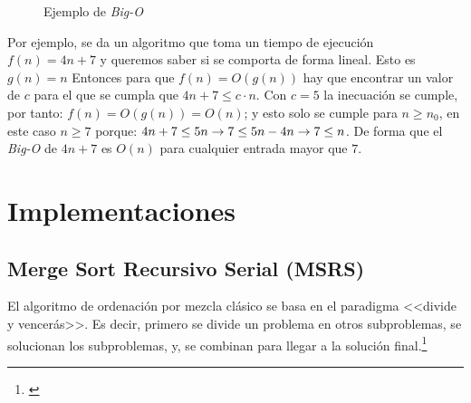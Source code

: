\documentclass[titlepage]{article}
\begin{document}
\begin{figure}
\captionsetup{justification=centering}
\centering    
    
    \caption{Ejemplo de \textit{Big-O}}
    \label{fig:bigO}
    
\end{figure}

Por ejemplo, se da un algoritmo que toma un tiempo de ejecución \(f(n) = 4n+7\) y queremos saber si se comporta de forma lineal. Esto es \(g(n)=n\) Entonces para que \(f(n) = O(g(n))\) hay que encontrar un valor de \(c\) para el que se cumpla que \(4n+7 \leq c\cdot n\). Con \(c=5\) la inecuación se cumple, por tanto: \(f(n) = O(g(n)) = O(n)\); y esto solo se cumple para \(n \geq n_0\), en este caso \(n\geq 7\) porque: \(4n+7 \leq 5n \space \rightarrow 7 \leq 5n - 4n   \rightarrow 7 \leq n\). De forma que el \textit{Big-O} de \(4n+7\) es \(O(n)\) para cualquier entrada mayor que \(7\).



\section{Implementaciones}

\subsection{Merge Sort Recursivo Serial (MSRS)}
El algoritmo de ordenación por mezcla clásico se basa en el paradigma <<divide y vencerás>>. Es decir, primero se divide un problema en otros subproblemas, se solucionan los subproblemas, y, se combinan para llegar a la solución
final.\footnote{\cite{Sedgewick2003-cd}}
\end{document}
